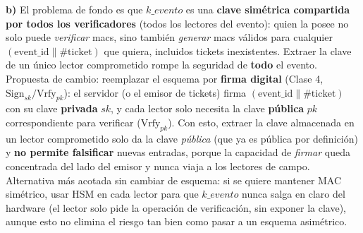 \textbf{b)} El problema de fondo es que $k\_evento$ es una \textbf{clave simétrica
compartida por todos los verificadores} (todos los lectores del evento): quien la posee no
solo puede \emph{verificar} macs, sino también \emph{generar} macs válidos para cualquier
$(\text{event\_id}\|\#\text{ticket})$ que quiera, incluidos tickets inexistentes. Extraer la
clave de un único lector comprometido rompe la seguridad de \textbf{todo} el evento.
Propuesta de cambio: reemplazar el esquema por \textbf{firma digital} (Clase 4,
$\mathrm{Sign}_{sk}/\mathrm{Vrfy}_{pk}$): el servidor (o el emisor de tickets) firma
$(\text{event\_id}\|\#\text{ticket})$ con su clave \textbf{privada} $sk$, y cada lector solo
necesita la clave \textbf{pública} $pk$ correspondiente para verificar ($\mathrm{Vrfy}_{pk}$).
Con esto, extraer la clave almacenada en un lector comprometido solo da la clave
\emph{pública} (que ya es pública por definición) y \textbf{no permite falsificar} nuevas
entradas, porque la capacidad de \emph{firmar} queda concentrada del lado del emisor y nunca
viaja a los lectores de campo. Alternativa más acotada sin cambiar de esquema: si se quiere
mantener MAC simétrico, usar HSM en cada lector para que $k\_evento$ nunca salga en claro del
hardware (el lector solo pide la operación de verificación, sin exponer la clave), aunque
esto no elimina el riesgo tan bien como pasar a un esquema asimétrico.


